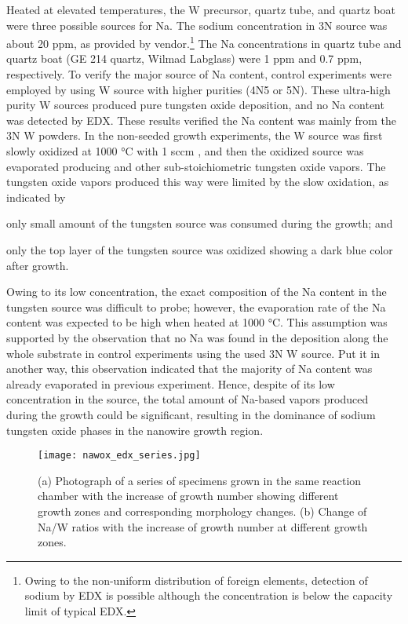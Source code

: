 Heated at elevated temperatures, the W precursor, quartz tube, and quartz boat were three possible sources for Na. The sodium concentration in 3N source was about 20 ppm, as provided by vendor.\footnote{Owing to the non-uniform distribution of foreign elements, detection of sodium by EDX is possible although the concentration is below the capacity limit of typical EDX.} The Na concentrations in quartz tube and quartz boat (GE 214 quartz, Wilmad Labglass) were 1 ppm and 0.7 ppm, respectively. To verify the major source of Na content, control experiments were employed by using W source with higher purities (4N5 or 5N). These ultra-high purity W sources produced pure tungsten oxide deposition, and no Na content was detected by EDX. These results verified the Na content was mainly from the 3N W powders. In the non-seeded growth experiments, the W source was first slowly oxidized at 1000 \si{\degreeCelsius} with 1 sccm , and then the oxidized source was evaporated producing  and other sub-stoichiometric tungsten oxide vapors. The tungsten oxide vapors produced this way were limited by the slow oxidation, as indicated by
\begin{enumerate*}[label=\itshape\alph*\upshape)]
\item only small amount of the tungsten source was consumed during the growth; and
\item only the top layer of the tungsten source was oxidized showing a dark blue color after growth.
\end{enumerate*} Owing to its low concentration, the exact composition of the Na content in the tungsten source was difficult to probe; however, the evaporation rate of the Na content was expected to be high when heated at 1000 \si{\degreeCelsius}. This assumption was supported by the observation that no Na was found in the deposition along the whole substrate in control experiments using the used 3N W source. Put it in another way, this observation indicated that the majority of Na content was already evaporated in previous experiment. Hence, despite of its low concentration in the source, the total amount of Na-based vapors produced during the growth could be significant, resulting in the dominance of sodium tungsten oxide phases in the nanowire growth region.

\begin{figure}[htb]
\centering
\texttt{[image: nawox\_edx\_series.jpg]}
\caption[Photograph of a series of specimens grown]{(a) Photograph of a series of specimens grown in the same reaction chamber with the increase of growth number showing different growth zones and corresponding morphology changes. (b) Change of Na/W ratios with the increase of growth number at different growth zones.}
\label{fig:nawoxser}
\end{figure}

